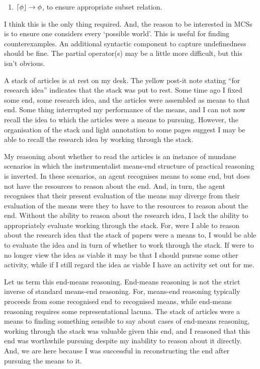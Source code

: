 \documentclass[10pt]{article}
\begin{document}
\begin{enumerate}
\item \(\mathord{\lceil{\phi}\rfloor} \rightarrow \phi\), to ensure appropriate subset relation.
\end{enumerate}

I think this is the only thing required.
And, the reason to be interested in MCSs is to ensure one considers every `possible world'.
This is useful for finding counterexamples.
An additional syntactic component to capture undefinedness should be fine.
The partial operator(s) may be a little more difficult, but this isn't obvious.



\newpage

A stack of articles is at rest on my desk.
The yellow post-it note stating ``for research idea'' indicates that the stack was put to rest.
Some time ago I fixed some end, some research idea, and the articles were assembled as means to that end.
Some thing interrupted my performance of the means, and I can not now recall the idea to which the articles were a means to pursuing.
However, the organisation of the stack and light annotation to some pages suggest I may be able to recall the research idea by working through the stack.

My reasoning about whether to read the articles is an instance of mundane scenarios in which the instrumentalist means-end structure of practical reasoning is inverted.
In these scenarios, an agent recognises means to some end, but does not have the resources to reason about the end.
And, in turn, the agent recognises that their present evaluation of the means may diverge from their evaluation of the means were they to have to the resources to reason about the end.
Without the ability to reason about the research idea, I lack the ability to appropriately evaluate working through the stack.
For, were I able to reason about the research idea that the stack of papers were a means to, I would be able to evaluate the idea and in turn of whether to work through the stack.
If were to no longer view the idea as viable it may be that I should pursue some other activity, while if I still regard the idea as viable I have an activity set out for me.

Let us term this end-means reasoning.
End-means reasoning is not the strict inverse of standard means-end reasoning.
For, means-end reasoning typically proceeds from some recognised end to recognised means, while end-means reasoning requires some representational lacuna.
The stack of articles were a means to finding something sensible to say about cases of end-means reasoning, working through the stack was valuable given this end, and I reasoned that this end was worthwhile pursuing despite my inability to reason about it directly.
And, we are here because I was successful in reconstructing the end after pursuing the means to it.
\end{document}
